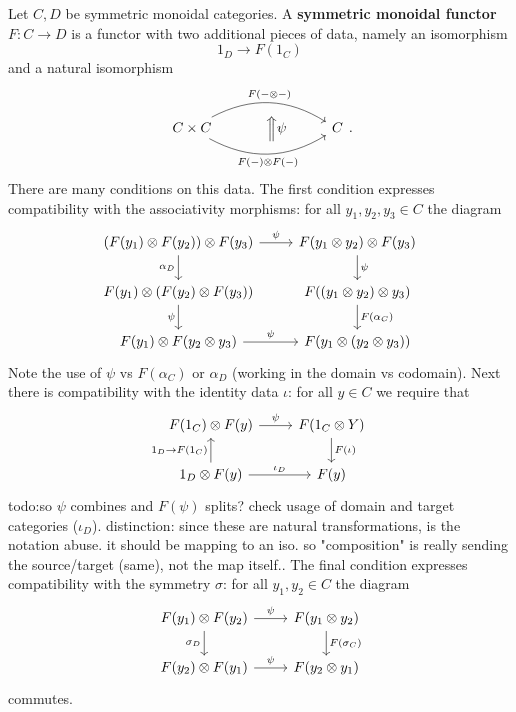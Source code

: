 \begin{definition}[]
    Let $C,D$ be symmetric monoidal categories. A \textbf{symmetric monoidal functor} $F \colon C \to D$ is a functor with two additional pieces of data, namely an isomorphism \[
        1_D \longrightarrow F(1_C)
    \]  and a natural isomorphism \[
        \begin{tikzcd}
            C\times C\arrow[rr, "F(-\otimes -)", bend left] \arrow[rr, "F(-)\otimes F(-)"', bend right] & \,\,~ \Big\Uparrow\psi  & C
\end{tikzcd}.
    \] There are many conditions on this data. The first condition expresses compatibility with the associativity morphisms: for all $y_1,y_2,y_3 \in C$ the diagram \[
   \begin{tikzcd}
(F(y_1)\otimes F(y_2))\otimes F(y_3) \arrow[r, "\psi"] \arrow[d, "\alpha_D"'] & F(y_1\otimes y_2)\otimes F(y_3) \arrow[d, "\psi"]       \\
F(y_1)\otimes (F(y_2)\otimes F(y_3)) \arrow[d, "\psi"']                       & F((y_1\otimes y_2)\otimes y_3) \arrow[d, "F(\alpha_C)"] \\
F(y_1)\otimes F(y_2 \otimes y_3) \arrow[r, "\psi"]                            & F(y_1\otimes (y_2\otimes y_3))                         
\end{tikzcd} 
    \] Note the use of $\psi$ vs $F(\alpha_C)$ or $\alpha _D$ (working in the domain vs codomain). Next there is compatibility with the identity data $\iota$: for all $y \in C$ we require that \[\begin{tikzcd}
F(1_C)\otimes F(y) \arrow[r, "\psi"]                             & F(1_C\otimes Y) \arrow[d, "F(\iota)"] \\
1_D\otimes F(y) \arrow[u, "1_D \to F(1_C)"] \arrow[r, "\iota_D"] & F(y)                                 
\end{tikzcd}
\] {\color{red}todo:so $\psi$ combines and $F(\psi)$ splits? check usage of domain and target categories ($\iota_D$). distinction: since these are natural transformations, is the notation abuse. it should be mapping to an iso. so "composition" is really sending the source/target (same), not the map itself.}. The final condition expresses compatibility with the symmetry $\sigma$: for all $y_1,y_2 \in C$ the diagram \[
    \begin{tikzcd}
F(y_1)\otimes F(y_2) \arrow[r, "\psi"] \arrow[d, "\sigma_D"'] & F(y_1\otimes y_2) \arrow[d, "F(\sigma_C)"] \\
F(y_2)\otimes F(y_1) \arrow[r, "\psi"]                        & F(y_2\otimes y_1)                         
\end{tikzcd}
    \] commutes.
\end{definition}

